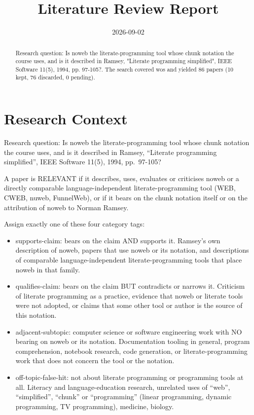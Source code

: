 \documentclass{article}
\title{Literature Review Report}
\date{2026-09-02}
\begin{document}
\maketitle

\begin{abstract}
Research question: Is noweb the literate-programming tool whose chunk notation the course uses, and is it described in Ramsey, "Literate programming simplified", IEEE Software 11(5), 1994, pp. 97-105?. The search covered wos and yielded 86 papers (10 kept, 76 discarded, 0 pending).
\end{abstract}
\clearpage
\clearpage
\tableofcontents
\clearpage

\section{Research Context}
Research question: Is noweb the literate-programming tool whose chunk
notation the course uses, and is it described in Ramsey, ``Literate
programming simplified'', IEEE Software 11(5), 1994, pp.~97-105?

A paper is RELEVANT if it describes, uses, evaluates or criticises noweb
or a directly comparable language-independent literate-programming tool
(WEB, CWEB, nuweb, FunnelWeb), or if it bears on the chunk notation
itself or on the attribution of noweb to Norman Ramsey.

Assign exactly one of these four category tags:

\begin{itemize}
\item
  supports-claim: bears on the claim AND supports it. Ramsey's own
  description of noweb, papers that use noweb or its notation, and
  descriptions of comparable language-independent literate-programming
  tools that place noweb in that family.
\item
  qualifies-claim: bears on the claim BUT contradicts or narrows it.
  Criticism of literate programming as a practice, evidence that noweb
  or literate tools were not adopted, or claims that some other tool or
  author is the source of this notation.
\item
  adjacent-subtopic: computer science or software engineering work with
  NO bearing on noweb or its notation. Documentation tooling in general,
  program comprehension, notebook research, code generation, or
  literate-programming work that does not concern the tool or the
  notation.
\item
  off-topic-false-hit: not about literate programming or programming
  tools at all. Literacy and language-education research, unrelated uses
  of ``web'', ``simplified'', ``chunk'' or ``programming'' (linear
  programming, dynamic programming, TV programming), medicine, biology.
\end{itemize}
\end{document}
